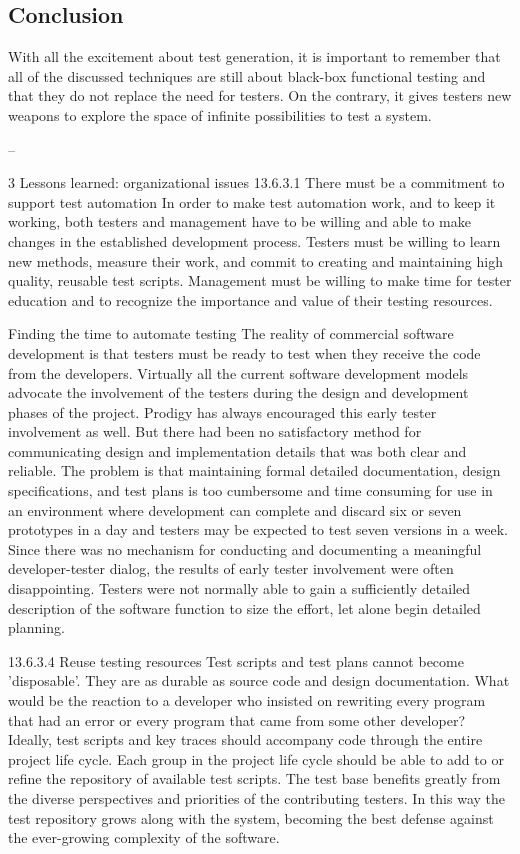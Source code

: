 \subsection{Conclusion}

With all the excitement about test generation, it is important to remember that
all of the discussed techniques are still about black-box functional testing and
that they do not replace the need for testers. On the contrary, it gives testers
new weapons to explore the space of infinite possibilities to test a system.

-- 

3 Lessons learned: organizational issues
13.6.3.1 There must be a commitment to support test automation
In order to make test automation work, and to keep it working, both testers
and management have to be willing and able to make changes in the established
development process.
Testers must be willing to learn new methods, measure their work, and
commit to creating and maintaining high quality, reusable test scripts.
Management must be willing to make time for tester education and to
recognize the importance and value of their testing resources. 

Finding the time to automate testing
The reality of commercial software development is that testers must be
ready to test when they receive the code from the developers.
Virtually all the current software development models advocate the
involvement of the testers during the design and development phases of the
project. Prodigy has always encouraged this early tester involvement as
well. But there had been no satisfactory method for communicating design
and implementation details that was both clear and reliable.
The problem is that maintaining formal detailed documentation, design
specifications, and test plans is too cumbersome and time consuming for
use in an environment where development can complete and discard six or
seven prototypes in a day and testers may be expected to test seven versions
in a week.
Since there was no mechanism for conducting and documenting a
meaningful developer-tester dialog, the results of early tester involvement
were often disappointing. Testers were not normally able to gain a sufficiently
detailed description of the software function to size the effort, let
alone begin detailed planning. 

13.6.3.4 Reuse testing resources
Test scripts and test plans cannot become 'disposable'. They are as durable
as source code and design documentation. What would be the reaction to a
developer who insisted on rewriting every program that had an error or
every program that came from some other developer?
Ideally, test scripts and key traces should accompany code through the
entire project life cycle. Each group in the project life cycle should be able
to add to or refine the repository of available test scripts.
The test base benefits greatly from the diverse perspectives and priorities
of the contributing testers. In this way the test repository grows along
with the system, becoming the best defense against the ever-growing complexity
of the software. 

